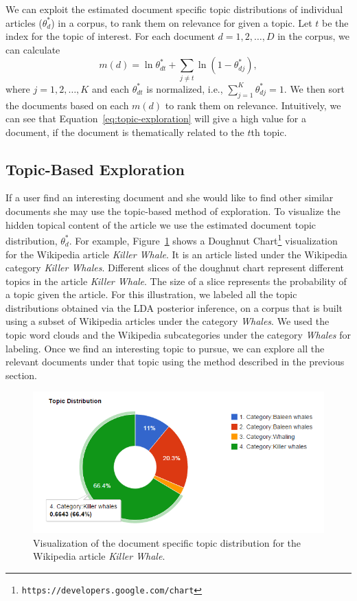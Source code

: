 \documentclass[letterpaper]{article}
\begin{document}
We can exploit the estimated document specific topic distributions 
 of individual articles ($\theta_d^{*}$) in a corpus, to rank them on 
relevance for given a topic. Let $t$ be the index for the topic of 
interest. For each document $d = 1, 2, \ldots, D$ in the corpus, we 
can calculate~\cite{George2012}
\begin{equation}
m(d) = \ln \theta^*_{dt} + \sum_{j \neq t}{\ln (1 - \theta^*_{dj})},
\label{eq:topic-exploration}
\end{equation} 
where $j = 1, 2, \ldots, K$ and each $\theta^*_{dt}$ is 
normalized, i.e., $\sum_{j=1}^{K}{\theta^*_{dj}} = 1$. We then sort 
the documents based on each $m(d)$ to rank them on relevance. 
Intuitively, we can see that Equation~\ref{eq:topic-exploration} 
will give a high value for a document, if the document is 
thematically related to the $t$th topic. 

\subsection{Topic-Based Exploration}

If a user find an interesting document and she would like to
find other similar documents she may use the topic-based method of exploration.
To visualize the hidden topical content of the article we use the 
estimated document topic distribution, $\theta^*_{d}$.
For example, Figure~\ref{fig:doc-topic-distribution} shows a Doughnut  
Chart\footnote{\texttt{https://developers.google.com/chart}} 
visualization for the Wikipedia article \textit{Killer Whale}.
It is an article listed under the Wikipedia category          
\textit{Killer Whales}. Different slices of the doughnut chart represent
different topics in the article \textit{Killer Whale}. The size 
of a slice represents the probability of a topic given the article. 
For this illustration, we labeled all the topic 
distributions obtained via the LDA posterior inference, on a 
corpus that is built using a subset of Wikipedia articles under the 
category \textit{Whales}. We used the topic word clouds 
and the Wikipedia subcategories under the category \textit{Whales} 
for labeling. Once we find an interesting topic to pursue, we can 
explore all the relevant documents under that topic using the 
method described in the previous section. 

\begin{figure}[htb]\centering 
\includegraphics[width=.45\textwidth]{doc_topic_distribution.png}
\caption{Visualization of the document specific topic distribution 
for the Wikipedia article \textit{Killer Whale}.}
\label{fig:doc-topic-distribution}
\end{figure}
\end{document}
